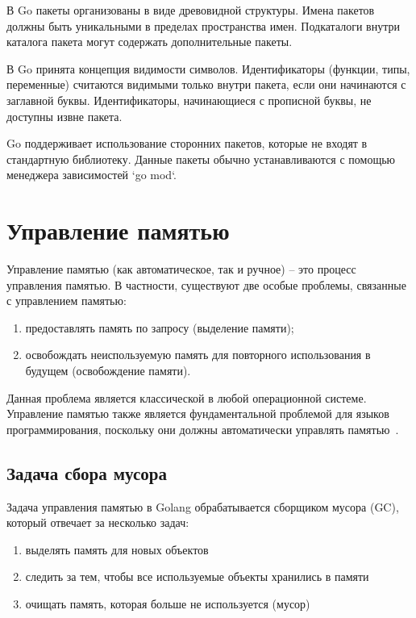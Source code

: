 В Go пакеты организованы в виде древовидной структуры.
Имена пакетов должны быть уникальными в пределах пространства имен.
Подкаталоги внутри каталога пакета могут содержать дополнительные пакеты.

В Go принята концепция видимости символов.
Идентификаторы (функции, типы, переменные) считаются видимыми только внутри пакета, если они начинаются с заглавной буквы.
Идентификаторы, начинающиеся с прописной буквы, не доступны извне пакета.

Go поддерживает использование сторонних пакетов, которые не входят в стандартную библиотеку.
Данные пакеты обычно устанавливаются с помощью менеджера зависимостей `go mod`.

\section{Управление памятью}

Управление памятью (как автоматическое, так и ручное) -- это процесс управления памятью.
В частности, существуют две особые проблемы, связанные с управлением памятью:
\begin{enumerate}
    \item предоставлять память по запросу (выделение памяти);
    \item освобождать неиспользуемую память для повторного использования в будущем (освобождение памяти).
\end{enumerate}

Данная проблема является классической в любой операционной системе.
Управление памятью также является фундаментальной проблемой для языков программирования, поскольку они должны автоматически управлять памятью~\cite{bruno2018study}.

\subsection*{Задача сбора мусора}

Задача управления памятью в Golang обрабатывается сборщиком мусора (GC), который отвечает за несколько задач:
\begin{enumerate}
    \item выделять память для новых объектов
    \item следить за тем, чтобы все используемые объекты хранились в памяти
    \item очищать память, которая больше не используется (мусор)
\end{enumerate}

